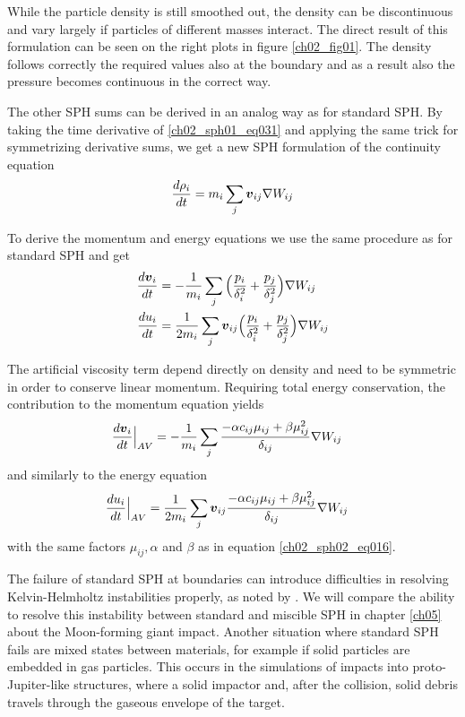 While the particle density is still smoothed out, the density can be discontinuous and vary largely if particles of different masses interact. The direct result of this formulation can be seen on the right plots in figure \ref{ch02_fig01}. The density follows correctly the required values also at the boundary and as a result also the pressure becomes continuous in the correct way.

The other SPH sums can be derived in an analog way as for standard SPH. By taking the time derivative of \ref{ch02_sph01_eq031} and applying the same trick for symmetrizing derivative sums, we get a new SPH formulation of the continuity equation 
\begin{equation}
\label{ch02_sph01_eq032}
\frac{d \rho_i}{dt} = m_i \sum_j \boldsymbol{v}_{ij} \nabla W_{ij}
\end{equation}

To derive the momentum and energy equations we use the same procedure as for standard SPH and get 
\begin{align}
\label{ch02_sph01_eq033}
\frac{d \boldsymbol{v}_i }{dt} &= - \frac{1}{m_i}  \sum_{j} \Big( \frac{p_i}{\delta_i^2} + \frac{p_j}{\delta_j^2} \Big) \nabla W_{ij} \\
\frac{du_i}{dt} &= \frac{1}{2 m_i}  \sum_{j} \boldsymbol{v}_{ij} \Big( \frac{p_i}{\delta_i^2}  + \frac{p_j}{\delta_j^2} \Big)  \nabla W_{ij} 
\end{align}

The artificial viscosity term depend directly on density and need to be symmetric in order to conserve linear momentum. Requiring total energy conservation, the contribution to the momentum equation yields
\begin{align}
\label{ch02_sph01_eq034}
\frac{d \boldsymbol{v}_i }{dt} \Big|_{AV} = - \frac{1}{m_i} & \sum_{j} \frac{- \alpha c_{ij} \mu_{ij} +  \beta \mu_{ij}^2 }{\delta_{ij} } \nabla W_{ij}
\end{align}
and similarly to the energy equation
\begin{align}
\label{ch02_sph01_eq035}
\frac{du_i}{dt}  \Big|_{AV} = \frac{1}{2 m_i} & \sum_{j} \boldsymbol{v}_{ij} \frac{- \alpha c_{ij} \mu_{ij} +  \beta \mu_{ij}^2 }{\delta_{ij} } \nabla W_{ij}
\end{align}
with the same factors $\mu_{ij}, \alpha$ and $\beta$ as in equation \ref{ch02_sph02_eq016}. 

The failure of standard SPH at boundaries can introduce difficulties in resolving Kelvin-Helmholtz instabilities properly, as noted by \cite{Agertz:2006p1552}. We will compare the ability to resolve this instability between standard and miscible SPH in chapter \ref{ch05} about the Moon-forming giant impact. Another situation where standard SPH fails are mixed states between materials, for example if solid particles are embedded in gas particles. This occurs in the simulations of impacts into proto-Jupiter-like structures, where a solid impactor and, after the collision, solid debris travels through the gaseous envelope of the target.

